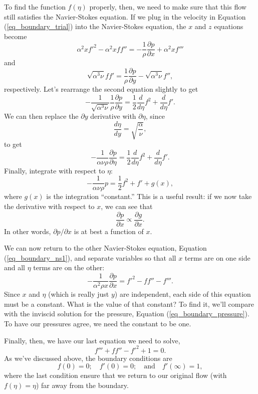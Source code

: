 To find the function $f(\eta)$ properly, then, we need to make sure that this flow still satisfies the Navier-Stokes equation.  If we plug in the velocity in Equation (\ref{eq_boundary_trial}) into the Navier-Stokes equation, the $x$ and $z$ equations become
\begin{equation}
\label{eq_boundary_ns1}
\alpha^2 x f'^2 - \alpha^2 x f f'' = -\frac{1}{\rho} \frac{\partial p}{\partial x} + \alpha^2 x f'''
\end{equation}
and
\begin{equation}
\sqrt{\alpha^3 \nu } ff' = \frac{1}{\rho} \frac{\partial p}{\partial y} - \sqrt{\alpha^3 \nu} f'',
\end{equation}
respectively.  Let's rearrange the second equation slightly to get
\[
-\frac{1}{\sqrt{\alpha^3 \nu}} \frac{1}{\rho} \frac{\partial p}{\partial y} = \frac{1}{2} \frac{d}{d\eta} f^2 + \frac{d}{d\eta} f'.
\]
We can then replace the $\partial y$ derivative with $\partial \eta$, since
\[
\frac{d\eta}{dy} = \sqrt{\frac{\alpha}{\nu}},
\]
to get
\[
-\frac{1}{\alpha \nu \rho} \frac{\partial p}{\partial \eta} = \frac{1}{2} \frac{d}{d\eta} f^2 + \frac{d}{d\eta} f'.
\]
Finally, integrate with respect to $\eta$:
\[
-\frac{1}{\alpha \nu \rho} p = \frac{1}{2} f^2 + f' + g(x),
\]
where $g(x)$ is the integration ``constant.''  This is a useful result:  if we now take the derivative with respect to $x$, we can see that 
\[
\frac{\partial p}{\partial x} \propto \frac{\partial g}{\partial x}.
\]
In other words, $\partial p / \partial x$ is at best a function of $x$.

We can now return to the other Navier-Stokes equation, Equation (\ref{eq_boundary_ns1}), and separate variables so that all $x$ terms are on one side and all $\eta$ terms are on the other:
\[
-\frac{1}{\alpha^2 \rho x} \frac{\partial p}{\partial x} = f'^2 - ff'' - f'''.
\]
Since $x$ and $\eta$ (which is really just $y$) are independent, each side of this equation must be a constant.  What is the value of that constant?  To find it, we'll compare with the inviscid solution for the pressure, Equation (\ref{eq_boundary_pressure}).  To have our pressures agree, we need the constant to be one.

Finally, then, we have our last equation we need to solve,
\begin{equation}
f''' + ff'' - f'^2 + 1 = 0.
\end{equation}
As we've discussed above, the boundary conditions are
\[
f(0) = 0; \quad f'(0) = 0; \quad \text{and} \quad f'(\infty) = 1,
\]
where the last condition ensure that we return to our original flow (with $f(\eta) = \eta$) far away from the boundary.

